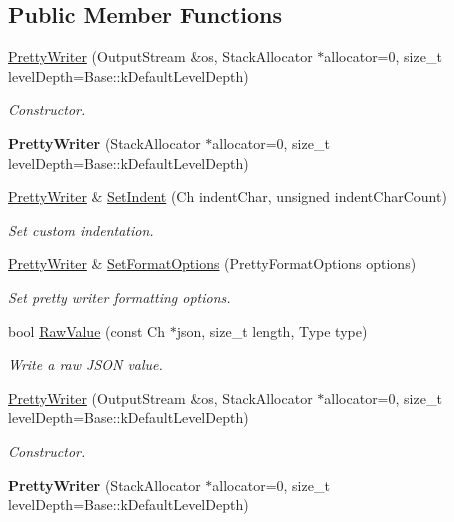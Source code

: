 \subsection*{Public Member Functions}
\begin{DoxyCompactItemize}
\item 
\hyperlink{class_pretty_writer_a928ac2a5235b8877048ebdd5f35a556f}{Pretty\+Writer} (Output\+Stream \&os, Stack\+Allocator $\ast$allocator=0, size\+\_\+t level\+Depth=Base\+::k\+Default\+Level\+Depth)
\begin{DoxyCompactList}\small\item\em Constructor. \end{DoxyCompactList}\item 
{\bfseries Pretty\+Writer} (Stack\+Allocator $\ast$allocator=0, size\+\_\+t level\+Depth=Base\+::k\+Default\+Level\+Depth)\hypertarget{class_pretty_writer_a4a9077e0300c6b0e1c830a58c1e738d2}{}\label{class_pretty_writer_a4a9077e0300c6b0e1c830a58c1e738d2}

\item 
\hyperlink{class_pretty_writer}{Pretty\+Writer} \& \hyperlink{class_pretty_writer_ad307b4c8d61af25042d0adcd0910c19a}{Set\+Indent} (Ch indent\+Char, unsigned indent\+Char\+Count)
\begin{DoxyCompactList}\small\item\em Set custom indentation. \end{DoxyCompactList}\item 
\hyperlink{class_pretty_writer}{Pretty\+Writer} \& \hyperlink{class_pretty_writer_a1ff9dbeff9b9c724080cb65987a41b73}{Set\+Format\+Options} (Pretty\+Format\+Options options)
\begin{DoxyCompactList}\small\item\em Set pretty writer formatting options. \end{DoxyCompactList}\item 
bool \hyperlink{class_pretty_writer_a440890a72408a150ef46edda6becdc94}{Raw\+Value} (const Ch $\ast$json, size\+\_\+t length, Type type)
\begin{DoxyCompactList}\small\item\em Write a raw J\+S\+ON value. \end{DoxyCompactList}\item 
\hyperlink{class_pretty_writer_a928ac2a5235b8877048ebdd5f35a556f}{Pretty\+Writer} (Output\+Stream \&os, Stack\+Allocator $\ast$allocator=0, size\+\_\+t level\+Depth=Base\+::k\+Default\+Level\+Depth)
\begin{DoxyCompactList}\small\item\em Constructor. \end{DoxyCompactList}\item 
{\bfseries Pretty\+Writer} (Stack\+Allocator $\ast$allocator=0, size\+\_\+t level\+Depth=Base\+::k\+Default\+Level\+Depth)\hypertarget{class_pretty_writer_a4a9077e0300c6b0e1c830a58c1e738d2}{}\label{class_pretty_writer_a4a9077e0300c6b0e1c830a58c1e738d2}


\end{DoxyCompactItemize}
